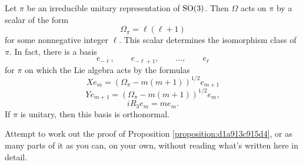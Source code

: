 \documentclass[reqno]{amsart} 
\numberwithin{equation}{section}
\begin{document}
\begin{proposition}\label{proposition:d1a913c915d4}
  Let $\pi$ be an irreducible unitary representation of $\operatorname{SO}(3)$.  Then $\Omega$ acts on $\pi$ by a scalar of the form
  \begin{equation}\label{eqn:d1a9136775d2}
    \Omega_\pi = \ell (\ell + 1)
  \end{equation}
  for some nonnegative integer $\ell$.  This scalar determines the isomorphism class of $\pi$.  In fact, there is a basis
  \begin{equation*}
    e_{- \ell}, \qquad e_{- \ell + 1}, \qquad \dotsc, \qquad e_{\ell }
  \end{equation*}
  for $\pi$ on which the Lie algebra acts by the formulas
  \begin{equation}\label{eqn:d1a913647caa}
    X e_m = \left( \Omega_\pi  - m (m + 1) \right)^{1/2} e_{m + 1}
  \end{equation}
  \begin{equation}\label{eqn:d1a9136592ce}
    Y e_{m+1} = \left( \Omega_\pi - m (m + 1) \right)^{1/2} e_{m},
  \end{equation}
  \begin{equation}\label{eqn:d1a91367ba12}
    i R_3 e_m = m e_m.
  \end{equation}
  If $\pi$ is unitary, then this basis is orthonormal.
\end{proposition}
\begin{exercise}\label{exercise:d1aa39b81acd}
Attempt to work out the proof of Proposition \ref{proposition:d1a913c915d4}, or as many parts of it as you can, on your own, without reading what's written here in detail.
\end{exercise}
\end{document}
